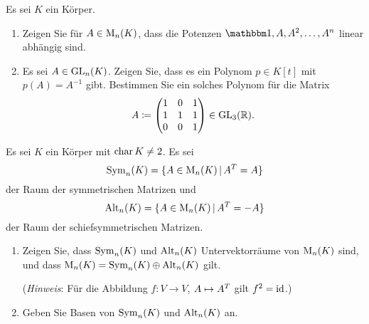 \documentclass[a4paper, 10pt]{scrartcl}
\begin{document}
\begin{question}[subtitle = Cayley-Hamilton]
  Es sei $K$ ein Körper.
  \begin{enumerate}
    \item
      Zeigen Sie für $A \in \operatorname{M}_{n}(K)$, dass die Potenzen $\Id, A, A^2, \dotsc, A^n$ linear abhängig sind.
    \item
      Es sei $A \in \operatorname{GL}_{n}(K)$.
      Zeigen Sie, dass es ein Polynom $p \in K[t]$ mit $p(A) = A^{-1}$ gibt.
      Bestimmen Sie ein solches Polynom für die Matrix
      \[
                  A
        \coloneqq \begin{pmatrix}
                    1 & 0 & 1 \\
                    1 & 1 & 1 \\
                    0 & 0 & 1
                  \end{pmatrix}
        \in \operatorname{GL}_{3}(\mathbb{R}).
      \]
  \end{enumerate}
\end{question}





\begin{question}[subtitle = Symmetrische und schiefsymmetrische Matrizen]
  Es sei $K$ ein Körper mit $\operatorname{char} K \neq 2$.
  Es sei
  \[
      \operatorname{Sym}_{n}(K)
    = \{ A \in \operatorname{M}_{n}(K) \,|\, A^T = A \}
  \]
  der Raum der symmetrischen Matrizen und
  \[
      \operatorname{Alt}_{n}(K)
    = \{ A \in \operatorname{M}_{n}(K) \,|\, A^T = -A\}
  \]
  der Raum der schiefsymmetrischen Matrizen.
  \begin{enumerate}
    \item
      Zeigen Sie, dass $\operatorname{Sym}_{n}(K)$ und $\operatorname{Alt}_{n}(K)$ Untervektorräume von $\operatorname{M}_{n}(K)$ sind, und dass $\operatorname{M}_{n}(K) = \operatorname{Sym}_{n}(K) \oplus \operatorname{Alt}_{n}(K)$ gilt.
      
      (\emph{Hinweis}:
       Für die Abbildung $f \colon V \to V$, $A \mapsto A^T$ gilt $f^2 = \operatorname{id}$.)
    \item
      Geben Sie Basen von $\operatorname{Sym}_{n}(K)$ und $\operatorname{Alt}_{n}(K)$ an.
  \end{enumerate}
\end{question}
\end{document}
